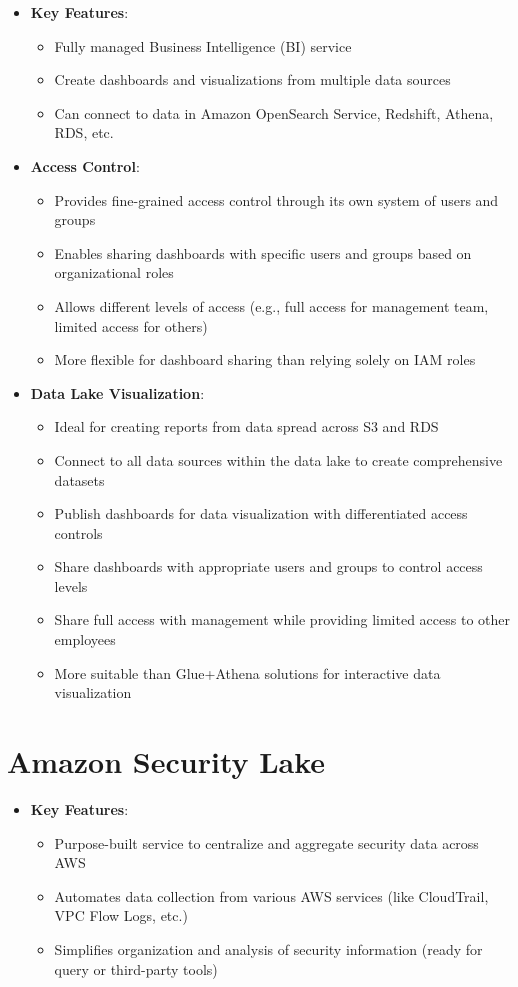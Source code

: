 \documentclass[11pt,a4paper]{report}
\begin{document}
\begin{itemize}
  \item \textbf{Key Features}:
\begin{itemize}
  \item Fully managed Business Intelligence (BI) service
  \item Create dashboards and visualizations from multiple data sources
  \item Can connect to data in Amazon OpenSearch Service, Redshift, Athena, RDS, etc.
\end{itemize}
  \item \textbf{Access Control}:
\begin{itemize}
  \item Provides fine-grained access control through its own system of users and groups
  \item Enables sharing dashboards with specific users and groups based on organizational roles
  \item Allows different levels of access (e.g., full access for management team, limited access for others)
  \item More flexible for dashboard sharing than relying solely on IAM roles
\end{itemize}
  \item \textbf{Data Lake Visualization}:
\begin{itemize}
  \item Ideal for creating reports from data spread across S3 and RDS
  \item Connect to all data sources within the data lake to create comprehensive datasets
  \item Publish dashboards for data visualization with differentiated access controls
  \item Share dashboards with appropriate users and groups to control access levels
  \item Share full access with management while providing limited access to other employees
  \item More suitable than Glue+Athena solutions for interactive data visualization
\end{itemize}
\end{itemize}


\section{Amazon Security Lake}

\begin{itemize}
  \item \textbf{Key Features}:
\begin{itemize}
  \item Purpose-built service to centralize and aggregate security data across AWS
  \item Automates data collection from various AWS services (like CloudTrail, VPC Flow Logs, etc.)
  \item Simplifies organization and analysis of security information (ready for query or third-party tools)
\end{itemize}
\end{itemize}
\end{document}
